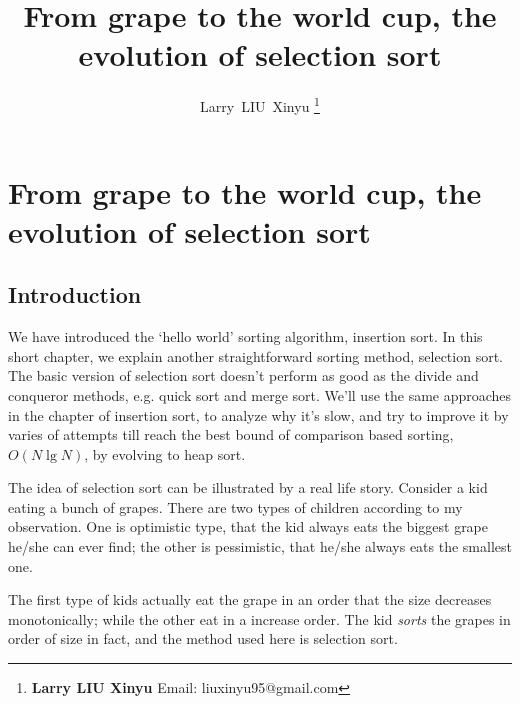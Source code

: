 \documentclass{article}
\begin{document}
\fi


\title{From grape to the world cup, the evolution of selection sort}

\author{Larry~LIU~Xinyu
\thanks{{\bfseries Larry LIU Xinyu } \newline
  Email: liuxinyu95@gmail.com \newline}
  }


\maketitle

\ifx\wholebook\relax
\chapter{From grape to the world cup, the evolution of selection sort}
\fi

\section{Introduction}
\label{introduction} 
We have introduced the `hello world' sorting algorithm, insertion
sort. In this short chapter, we explain another straightforward
sorting method, selection sort. The basic version of
selection sort doesn't perform as good as the divide and conqueror
methods, e.g. quick sort and merge sort. We'll use
the same approaches in the chapter of insertion sort, to
analyze why it's slow, and try to improve it by varies of
attempts till reach the best bound of comparison
based sorting, $O(N \lg N)$, by evolving to heap sort.

The idea of selection sort can be illustrated by a real life
story. Consider a kid eating a bunch of grapes. There are two
types of children according to my observation. One is optimistic
type, that the kid always eats the biggest grape he/she can ever
find; the other is pessimistic, that he/she always eats the
smallest one.

The first type of kids actually eat the grape in an order that
the size decreases monotonically; while the other eat in a increase
order. The kid {\em sorts} the grapes in order of size in fact,
and the method used here is selection sort.
\end{document}
